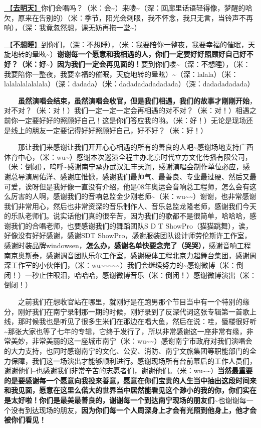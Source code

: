 \documentclass[]{ctexbook}
\begin{document}
\hyperref[go-tomorrow]{🎵【\textbf{去明天}】}你们会唱吗？（米：会\textasciitilde）来喽\textasciitilde（深：回廊里话语轻得像，梦醒的哈欠，原来在告别的）（米：季节，阳光会刺眼，我不怀念，我只无言，当铃声不再响），（深：我竟忽然想，课无妨再拖一堂\textasciitilde）

\hyperref[keep-playing]{🎵【\textbf{不想睡}】}到你们，（深：不想睡），（米：我要陪你一整夜，我要幸福的催眠，天旋地转的晕眩\textasciitilde）\textbf{谢谢每一个愿意和我相遇的人，你们一定要好好照顾好自己好不好？（米：好\textasciitilde）因为我们一定会再见面的！}要到你们喽\textasciitilde（深：不想睡），（米：我要陪你一整夜，我要幸福的催眠，天旋地转的晕眩）\textasciitilde（深：lalala）（米：lalalalalalalala）（深：dadada）（米：dadadadadadadada）（深：dadadadadada）

  \textbf{虽然演唱会结束，虽然演唱会收官，但是我们相遇，我们的故事才刚刚开始}，对不对？（米：对！）我们一定一定一定会再相遇的对不对？（米：对！）相遇之前你一定要好好的照顾好自己！这是你们答应我的哟。（米：好！）无论是现场还是线上的朋友一定要记得好好照顾好自己，好不好？（米：好！）

  那让我们来感谢让我们开开心心相遇的所有的善良的人吧\textasciitilde 感谢场地支持广西体育中心，（米：wu\textasciitilde）感谢本次巡演全程主办北京时代立方文化传播有限公司，（米：倒闭），呜呼\textasciitilde 感谢南宁承办武汉汇丰天润，感谢演唱会制作单位必应，感谢总导演周佑洋、感谢庄惟惞，感谢我们最帅气、最善良、专业最过硬、然后又最可爱，诶呀但是我好像一直没有介绍，他是08年奥运会音响总工程师，怎么会有这么厉害的人啊，感谢我们的音响总监金少刚老师\textasciitilde（米：wu\textasciitilde\textasciitilde）谢谢，也非常感谢我们非常用心，然后也非常资深的音乐制作人、音乐总监龙隆老师，感谢我们今天的乐队老师们。说实话他们真的很辛苦，因为我们的歌都不是很简单，哈哈哈，感谢我们的合唱老师，也要感谢我们的舞蹈团队S D T ShowPro（猫猫跳舞），诶，好像没有好好感谢，感谢SDT ShowPro，感谢服装团队设计师劳伦斯许工作室，感谢时装品牌windowsen，\textbf{怎么办，感谢名单快要念完了（哭哭）}，感谢音响工程南京奥斯泰，感谢调音团队乐尔工作室，感谢硬体工程北京力超舞台集团，感谢周深工作室的小伙伴们，（米：wu\textasciitilde\textasciitilde\textasciitilde\textasciitilde\textasciitilde）我们会继续努力的\textasciitilde 感谢微博（米：倒闭！）一秒止住眼泪，哈哈哈，感谢微博音乐（米：倒闭！）感谢微博演出（米：倒闭！）

  之前我们在想收官站在哪里，就刚好是在跑男那个节目当中有一个特别的缘分，刚好我们在南宁录制那一期的时候，刚好录到了反深代词这张专辑第一首歌上线，那时候我也是听见了很多生米们在那边在唱大鱼，然后在说：哇，蜃楼很好听\textasciitilde 那张大家也等了七年的专辑，它终于发行了，所以非常感谢这一座非常有缘，非常美妙，非常美丽的这一座城市南宁（米：wu\textasciitilde\textasciitilde）感谢南宁市政府对我们演唱会的大力支持，也同时感谢南宁的文化、公安、消防、南宁文旅集团等职能部门的全力保障，我们这一场演出才能够顺利进行。感谢现场所有台前幕后的工作人员们，谢谢他们\textasciitilde 也感谢我们非常辛苦的志愿者们，谢谢他们。（米：wu\textasciitilde\textasciitilde）\textbf{当然最重要的是要感谢每一个愿意向我投来善意，愿意在你们宝贵的人生当中抽出这段时间来和我见面，愿意在这里么偌大的世界当中居然能看见这个渺小的我的你，你们实在是太好啦！你们是最美最善良的，谢谢每一个到达南宁现场的朋友们\textasciitilde{}}也谢谢每一个没有到达现场的朋友，\textbf{因为你们每一个人周深身上才会有光照到他身上，他才会被你们看见！}
\end{document}
